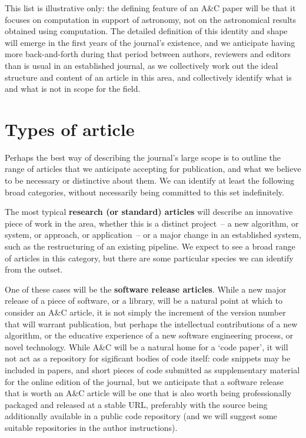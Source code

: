 This list is illustrative only: the defining feature of an A\&C paper will be that it focuses on computation in support of astronomy, not on the astronomical results obtained using computation. 
The detailed definition of this identity and shape will emerge in the first years of the
journal's existence, and we anticipate having more back-and-forth
during that period between authors, reviewers and editors than is usual in an
established journal, as we collectively work out the ideal structure
and content of an article in this area, and collectively identify what
is and what is not in scope for the field.



\section{Types of article}
\label{types}

Perhaps the best way of describing the journal's large scope is to
outline the range of articles that we anticipate accepting for publication,
and what we believe to be necessary or distinctive about them.  We
can identify at least the following broad categories, without necessarily being
committed to this set indefinitely.

The most typical \textbf{research (or standard) articles} will describe an
innovative piece of work in the area, whether this
is a distinct project~-- a new algorithm, or system, or approach, or
application~-- or a major change in an established system, such as the
restructuring of an existing pipeline.  We expect to see a broad range
of articles in this category, but there are some particular species we
can identify from the outset.

One of these cases will be the \textbf{software release
articles}.   While a new major release of a piece of software, or a
library, will be a natural point at which to consider an A\&C article,
it is not simply the increment of the version number that will
warrant publication, but perhaps the intellectual contributions of a
new algorithm, or the educative experience of a new software
engineering process, or novel technology. While A\&C will be a natural home for a `code
paper', it will not act as a repository for sigificant bodies of code itself: code snippets may
be included in papers, and short pieces of code submitted as supplementary material for the online edition of the journal, but  we anticipate that a software release that is
worth an A\&C article will be one that is also worth being professionally packaged and
released at a stable URL, preferably with the source being additionally
available in a public code repository (and we will suggest some suitable
repositories in the author instructions).  

